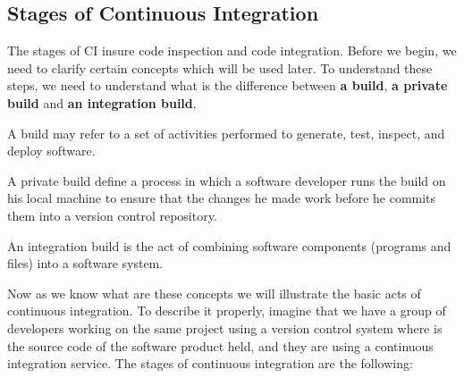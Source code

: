 \subsection{Stages of Continuous Integration}

The stages of CI insure code inspection and code integration. Before we begin, we need to clarify certain concepts which will be used later. To understand these steps, we need to understand what is the difference between \textbf{a build}, \textbf{a private build} and \textbf{an integration build}.

\begin{DEF}
A build may refer to a set of activities performed to generate, test, inspect, and deploy software\cite{CIbook}.
\end{DEF}

\begin{DEF}
A private build define a process in which a software developer runs the build on his local machine to ensure that the changes he made work before he commits them into a version control repository.
\end{DEF}

\begin{DEF}
An integration build is the act of combining software components (programs and files) into a software system\cite{CIbook}.
\end{DEF}

Now as we know what are these concepts we will illustrate the basic acts of continuous integration. To describe it properly, imagine that we have a group of developers working on the same project using a version control system where is the source code of the software product held, and they are using a continuous integration service. The stages of continuous integration are the following:

